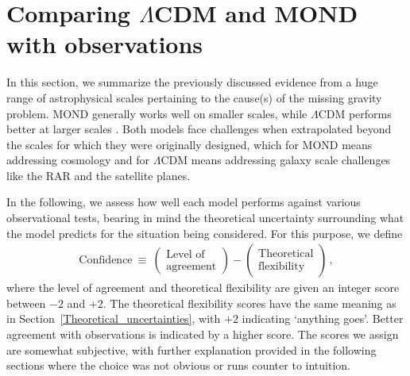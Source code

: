 \documentclass[fleqn,usenatbib,useAMS]{mnras} %
\begin{document}
\section{Comparing \texorpdfstring{$\Lambda$}{L}CDM and MOND with observations}
\label{Comparison_with_observations}

In this section, we summarize the previously discussed evidence from a huge range of astrophysical scales pertaining to the cause(s) of the missing gravity problem. MOND generally works well on smaller scales, while $\Lambda$CDM performs better at larger scales \citep{Massimi_2018}. Both models face challenges when extrapolated beyond the scales for which they were originally designed, which for MOND means addressing cosmology and for $\Lambda$CDM means addressing galaxy scale challenges like the RAR and the satellite planes.

In the following, we assess how well each model performs against various observational tests, bearing in mind the theoretical uncertainty surrounding what the model predicts for the situation being considered. For this purpose, we define
\begin{eqnarray}
	\text{Confidence} ~\equiv~ \begin{pmatrix} \text{Level of} \\ \text{agreement} \end{pmatrix} - \begin{pmatrix} \text{Theoretical} \\ \text{flexibility} \end{pmatrix} \, ,
	\label{Confidence_definition}
\end{eqnarray}
where the level of agreement and theoretical flexibility are given an integer score between $-2$ and $+2$. The theoretical flexibility scores have the same meaning as in Section~\ref{Theoretical_uncertainties}, with $+2$ indicating `anything goes'. Better agreement with observations is indicated by a higher score. The scores we assign are somewhat subjective, with further explanation provided in the following sections where the choice was not obvious or runs counter to intuition.
\end{document}
